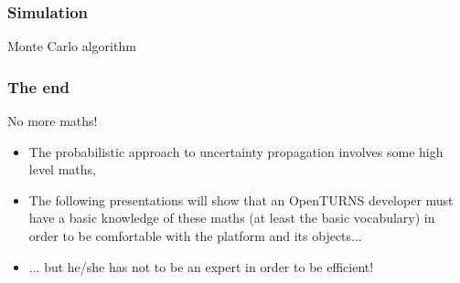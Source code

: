 \documentclass[8pt]{beamer}
\begin{document}
\begin{frame}
  \frametitle{Simulation}
  \begin{block}{Monte Carlo algorithm}
    \centering {}
  \end{block}
\end{frame}
\begin{frame}
\LARGE
  \frametitle{The end}
  \begin{block}{No more maths!}
    \begin{itemize}
    \item The probabilistic approach to uncertainty propagation involves some high level maths,
    \item The following presentations will show that an OpenTURNS developer must have a basic knowledge of these maths (at least the basic vocabulary) in order to be comfortable with the platform and its objects...
    \item ... but he/she has not to be an expert in order to be efficient!
    \end{itemize}
  \end{block}
\end{frame}
\end{document}
